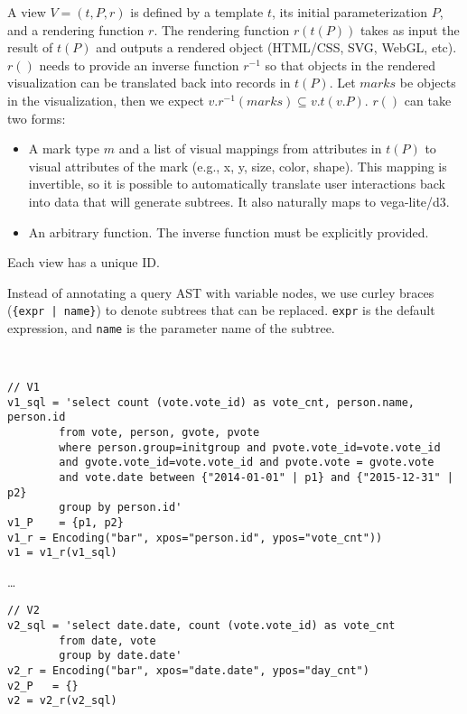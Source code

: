 A view $V = (t, P, r)$ is defined by a template $t$, its initial parameterization $P$, and a rendering function $r$.  
The rendering function $r(t(P))$ takes as input the result of $t(P)$ and outputs a rendered object (HTML/CSS, SVG, WebGL, etc). $r()$ needs to provide an inverse function $r^{-1}$ so that objects in the rendered visualization can be translated back into records in $t(P)$.  Let $marks$ be objects in the visualization, then we expect $v.r^{-1}(marks)\subseteq v.t(v.P)$.    $r()$ can take two forms:
\begin{itemize}
  \item {}  A mark type $m$ and a list of visual mappings from attributes in $t(P)$ to visual attributes of the mark (e.g., x, y, size, color, shape).  This mapping is invertible, so it is possible to automatically translate user interactions back into data that will generate subtrees.  It also naturally maps to vega-lite/d3.
  \item {} An arbitrary function.  The inverse function must be explicitly provided.
\end{itemize}

\noindent Each view has a unique ID.

\begin{example}

  Instead of annotating a query AST with variable nodes, we use curley braces (\texttt{\{expr | name\}}) to denote subtrees that can be replaced. 
  \texttt{expr} is the default expression, and \texttt{name} is the parameter name of the subtree.

\begin{lstlisting}


// V1
v1_sql = 'select count (vote.vote_id) as vote_cnt, person.name, person.id 
		from vote, person, gvote, pvote 
		where person.group=initgroup and pvote.vote_id=vote.vote_id 
		and gvote.vote_id=vote.vote_id and pvote.vote = gvote.vote 
        and vote.date between {"2014-01-01" | p1} and {"2015-12-31" | p2}
		group by person.id'
v1_P    = {p1, p2}
v1_r = Encoding("bar", xpos="person.id", ypos="vote_cnt"))
v1 = v1_r(v1_sql)
\end{lstlisting}

\dots

\begin{lstlisting}
// V2
v2_sql = 'select date.date, count (vote.vote_id) as vote_cnt
		from date, vote 
		group by date.date'
v2_r = Encoding("bar", xpos="date.date", ypos="day_cnt")
v2_P   = {}
v2 = v2_r(v2_sql)
\end{lstlisting}
\end{example}


